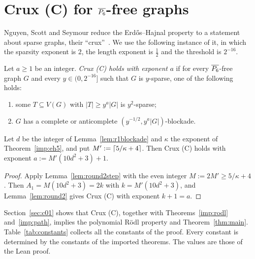 \section{Crux (C) for \texorpdfstring{$\overline{P_6}$}{co-P6}-free graphs}\label{sec:conclusion}

Nguyen, Scott and Seymour reduce the Erd\H{o}s--Hajnal property to a statement about sparse graphs,
their ``crux''~\cite[Section 7]{NSS7}. We use the following instance of it, in which the sparsity
exponent is $2$, the length exponent is $\frac12$ and the threshold is $2^{-16}$.

\begin{definition}\label{def:crux}
Let $a\ge1$ be an integer. \emph{Crux (C) holds with exponent $a$} if for every $\overline{P_6}$-free graph $G$ and
every $y\in(0,2^{-16}]$ such that $G$ is $y$-sparse, one of the following holds:
\begin{enumerate}[label=(\roman*)]
\item some $T\subseteq V(G)$ with $|T|\ge y^a|G|$ is $y^2$-sparse;
\item $G$ has a complete or anticomplete $(y^{-1/2},y^a|G|)$-blockade.
\end{enumerate}
\end{definition}

\begin{corollary}\label{cor:crux}
Let $d$ be the integer of Lemma~\ref{lem:r1blockade} and $\kappa$ the exponent of Theorem~\ref{imp:eh5},
and put $M':=\lceil 5/\kappa+4\rceil$. Then Crux (C) holds with exponent $a:=M'(10d^2+3)+1$.
\end{corollary}
\begin{proof}
Apply Lemma~\ref{lem:round2step} with the even integer $M:=2M'\ge5/\kappa+4$. Then $A_1=M(10d^2+3)=2k$
with $k=M'(10d^2+3)$, and Lemma~\ref{lem:round2} gives Crux (C) with exponent $k+1=a$.
\end{proof}

Section~\ref{sec:c01} shows that Crux (C), together with Theorems~\ref{imp:rodl} and~\ref{imp:path}, implies
the polynomial R\"odl property and Theorem~\ref{thm:main}. Table~\ref{tab:constants} collects all the
constants of the proof. Every constant is determined by the constants of the imported theorems. The
values are those of the Lean proof.

